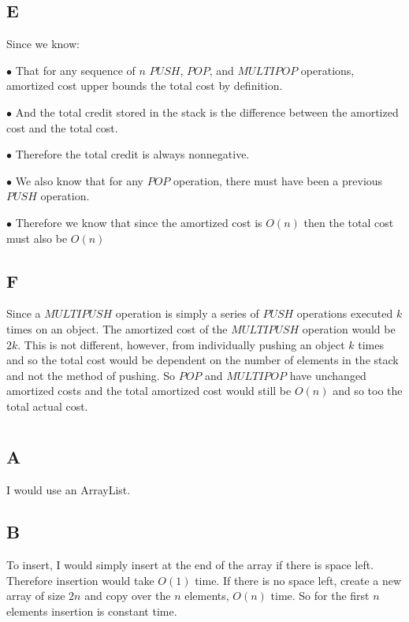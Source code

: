 \documentclass[12pt]{article}
\begin{document}
\subsection{E}

Since we know:

$\bullet $ That for any sequence of $n$ $PUSH$, $POP$, and $MULTIPOP$ operations, amortized cost upper bounds the total cost by definition.

$\bullet$ And the total credit stored in the stack is the difference between the amortized cost and the total cost.

$\bullet$ Therefore the total credit is always nonnegative.

$\bullet$ We also know that for any $POP$ operation, there must have been a previous $PUSH$ operation.

$\bullet$ Therefore we know that since the amortized cost is $O(n)$ then the total cost must also be $O(n)$

\subsection{F}

Since a $MULTIPUSH$ operation is simply a series of $PUSH$ operations executed $k$ times on an object. The amortized cost of the $MULTIPUSH$ operation would be $2k$. This is not different, however, from individually pushing an object $k$ times and so the total cost would be dependent on the number of elements in the stack and not the method of pushing. So $POP$ and $MULTIPOP$ have unchanged amortized costs and the total amortized cost would still be $O(n)$ and so too the total actual cost.

\pagebreak

\section{}

\subsection{A}

I would use an ArrayList.

\subsection{B}

To insert, I would simply insert at the end of the array if there is space left. Therefore insertion would take $O(1)$ time. If there is no space left, create a new array of size $2n$ and copy over the $n$ elements, $O(n)$ time. So for the first $n$ elements insertion is constant time.
\end{document}
